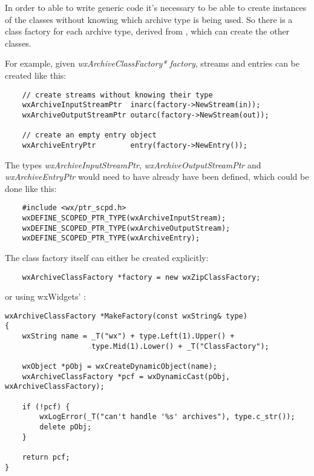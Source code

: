 \begin{twocollist}\twocolwidtha{5cm}
\end{twocollist}

In order to able to write generic code it's necessary to be able to create
instances of the classes without knowing which archive type is being used.
So there is a class factory for each archive type, derived from
 , which can create
the other classes.

For example, given {\it wxArchiveClassFactory* factory}, streams and
entries can be created like this:

\begin{verbatim}
    // create streams without knowing their type
    wxArchiveInputStreamPtr  inarc(factory->NewStream(in));
    wxArchiveOutputStreamPtr outarc(factory->NewStream(out));

    // create an empty entry object
    wxArchiveEntryPtr        entry(factory->NewEntry());

\end{verbatim}

The  types {\em wxArchiveInputStreamPtr},
{\em wxArchiveOutputStreamPtr} and {\em wxArchiveEntryPtr} would need to
have already have been defined, which could be done like this:

\begin{verbatim}
    #include <wx/ptr_scpd.h>
    wxDEFINE_SCOPED_PTR_TYPE(wxArchiveInputStream);
    wxDEFINE_SCOPED_PTR_TYPE(wxArchiveOutputStream);
    wxDEFINE_SCOPED_PTR_TYPE(wxArchiveEntry);

\end{verbatim}

The class factory itself can either be created explicitly:

\begin{verbatim}
    wxArchiveClassFactory *factory = new wxZipClassFactory;

\end{verbatim}

or using wxWidgets' :

\begin{verbatim}
wxArchiveClassFactory *MakeFactory(const wxString& type)
{
    wxString name = _T("wx") + type.Left(1).Upper() +
                    type.Mid(1).Lower() + _T("ClassFactory");

    wxObject *pObj = wxCreateDynamicObject(name);
    wxArchiveClassFactory *pcf = wxDynamicCast(pObj, wxArchiveClassFactory);

    if (!pcf) {
        wxLogError(_T("can't handle '%s' archives"), type.c_str());
        delete pObj;
    }

    return pcf;
}

\end{verbatim}


